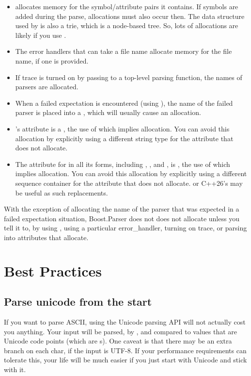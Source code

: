\documentclass{MyBook}
\begin{document}
\begin{itemize}
\item
   allocates memory for the symbol/attribute pairs it contains. If symbols are added during the parse, allocations must also occur then. The data structure used by  is also a trie, which is a node-based tree. So, lots of allocations are likely if you use .
\item
  The error handlers that can take a file name allocate memory for the file name, if one is provided.
\item
  If trace is turned on by passing  to a top-level parsing function, the names of parsers are allocated.
\item
  When a failed expectation is encountered (using ), the name of the failed parser is placed into a , which will usually cause an allocation.
\item
  's attribute is a , the use of which implies allocation. You can avoid this allocation by explicitly using a different string type for the attribute that does not allocate.
\item
  The attribute for  in all its forms, including , , and , is \emph{}, the use of which implies allocation. You can avoid this allocation by explicitly using a different sequence container for the attribute that does not allocate.  or C++26's  may be useful as such replacements.
\end{itemize}

With the exception of allocating the name of the parser that was expected in a failed expectation situation, Boost.Parser does not does not allocate unless you tell it to, by using , using a particular error\_handler, turning on trace, or parsing into attributes that allocate.

\section{Best Practices}

\subsection{Parse unicode from the start}

If you want to parse ASCII, using the Unicode parsing API will not actually cost you anything. Your input will be parsed,  by , and compared to values that are Unicode code points (which are s). One caveat is that there may be an extra branch on each char, if the input is UTF-8. If your performance requirements can tolerate this, your life will be much easier if you just start with Unicode and stick with it.
\end{document}
